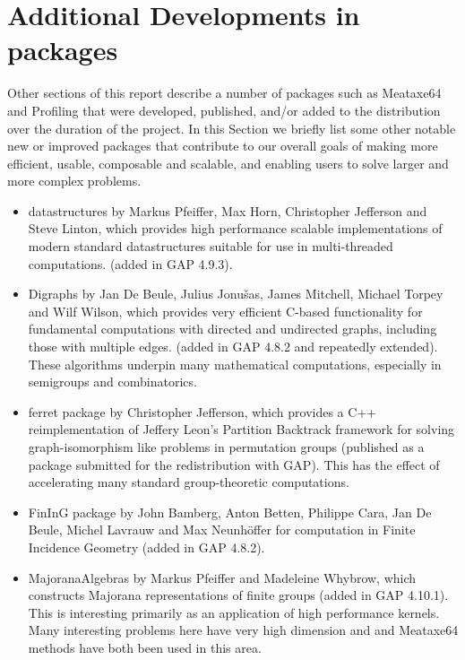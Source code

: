 \section{Additional Developments in \GAP packages} \label{sec:packages}

Other sections of this report describe
a number of \GAP packages such as Meataxe64 and Profiling that were developed, published,
and/or added to the \GAP distribution over the duration of the project.  In this Section
we briefly list some other notable new or improved packages that
contribute to our overall goals of making \GAP more efficient, usable,
composable and scalable, and enabling users to solve larger and more
complex problems.

\begin{itemize}

\item
{\sf datastructures} \cite{datastructures} by Markus Pfeiffer, Max Horn, 
Christopher Jefferson and Steve Linton, which provides high
performance scalable implementations of modern standard datastructures
suitable for use in multi-threaded computations. (added in GAP 4.9.3).

\item
{\sf Digraphs} by Jan De Beule, Julius Jonu\v{s}as, James Mitchell,
Michael Torpey and Wilf Wilson, which provides very efficient C-based
functionality for fundamental computations
with directed and undirected graphs, including those with multiple edges. (added in GAP 4.8.2 and
repeatedly extended).  These algorithms underpin many mathematical
computations, especially in semigroups and combinatorics.

\item
{\sf ferret} package by Christopher Jefferson, which provides a C++
reimplementation of Jeffery Leon's Partition Backtrack framework for
solving graph-isomorphism like problems in permutation groups
(published as a package submitted for the redistribution with
GAP). This has the effect of accelerating many standard
group-theoretic computations.

\item
{\sf FinInG} package by John Bamberg, Anton Betten, Philippe Cara, Jan De Beule, Michel Lavrauw and Max Neunh\"offer for computation in Finite Incidence Geometry (added in GAP 4.8.2).

\item
{\sf MajoranaAlgebras} by Markus Pfeiffer and Madeleine Whybrow, 
which constructs Majorana representations of finite groups (added in
GAP 4.10.1). This is interesting primarily as an application of high
performance kernels. Many interesting problems here have very high
dimension and \HPCGAP and Meataxe64 methods have both been used in
this area.


\end{itemize}
